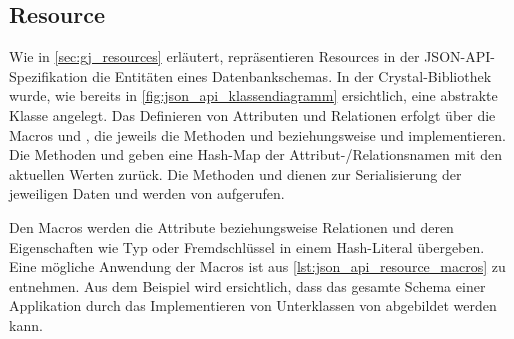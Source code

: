 \subsection{Resource}
\label{ssec:bj_resource}

Wie in \cref{sec:gj_resources} erläutert, repräsentieren Resources in der
JSON-API-Spezifikation die Entitäten eines Datenbankschemas.  In der
Crystal-Bibliothek wurde, wie bereits in \cref{fig:json_api_klassendiagramm}
ersichtlich, eine abstrakte Klasse  angelegt.  Das Definieren
von Attributen und Relationen erfolgt über die Macros  und
, die jeweils die Methoden  und
 beziehungsweise  und
 implementieren.  Die Methoden
 und  geben eine Hash-Map der
Attribut-/Relationsnamen mit den aktuellen Werten zurück.  Die Methoden
 und  dienen zur
Serialisierung der jeweiligen Daten und werden von 
aufgerufen.

Den Macros werden die Attribute beziehungsweise Relationen und deren
Eigenschaften wie Typ oder Fremdschlüssel in einem Hash-Literal übergeben.
Eine mögliche Anwendung der Macros ist aus \cref{lst:json_api_resource_macros}
zu entnehmen.  Aus dem Beispiel wird ersichtlich, dass das gesamte Schema einer
Applikation durch das Implementieren von Unterklassen von 
abgebildet werden kann.


